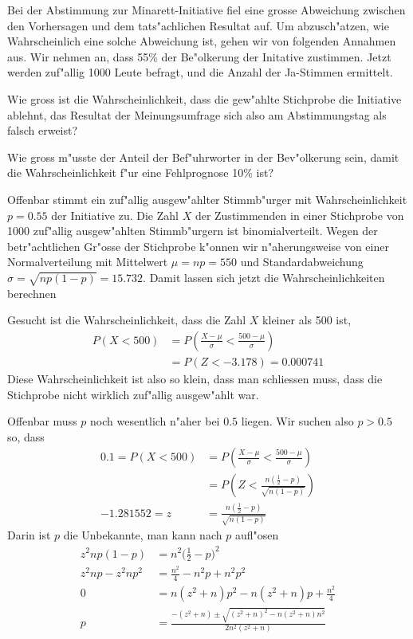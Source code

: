 Bei der Abstimmung zur Minarett-Initiative fiel eine grosse Abweichung zwischen
den Vorhersagen und dem tats"achlichen Resultat auf. Um abzusch"atzen,
wie Wahrscheinlich eine solche Abweichung ist, gehen wir von folgenden
Annahmen aus. Wir nehmen an, dass 55\% der Be"olkerung der Initative
zustimmen. Jetzt werden zuf"allig 1000 Leute befragt, und die Anzahl der
Ja-Stimmen ermittelt.
\begin{teilaufgaben}
\item
Wie gross ist die Wahrscheinlichkeit, dass die
gew"ahlte Stichprobe die Initiative ablehnt, das Resultat der
Meinungsumfrage sich also am Abstimmungstag als falsch erweist?
\item Wie gross m"usste der Anteil der Bef"uhrworter in der Bev"olkerung
sein, damit die Wahrscheinlichkeit f"ur eine Fehlprognose 10\% ist?
\end{teilaufgaben}

\begin{loesung}
Offenbar stimmt ein zuf"allig ausgew"ahlter Stimmb"urger mit
Wahrscheinlichkeit $p=0.55$ der Initiative zu. Die Zahl $X$ der Zustimmenden
in einer Stichprobe von 1000 zuf"allig ausgew"ahlten Stimmb"urgern ist
binomialverteilt. Wegen der betr"achtlichen Gr"osse der Stichprobe k"onnen
wir n"aherungsweise von einer Normalverteilung mit Mittelwert $\mu=np=550$ und
Standardabweichung $\sigma=\sqrt{np(1-p)}
=15.732
$.
Damit lassen sich jetzt die Wahrscheinlichkeiten berechnen
\begin{teilaufgaben}
\item
Gesucht ist die Wahrscheinlichkeit, dass die Zahl $X$ kleiner als 500 ist,
\begin{align*}
P(X < 500)&=P\left(\frac{X-\mu}{\sigma}<\frac{500-\mu}{\sigma}\right)\\
        &=P(Z<
-3.178
)=0.000741
\end{align*}
Diese Wahrscheinlichkeit ist also so klein, dass man schliessen muss,
dass die Stichprobe nicht wirklich zuf"allig ausgew"ahlt war.
\item
Offenbar muss $p$ noch wesentlich n"aher bei $0.5$ liegen.  Wir suchen also
$p>0.5$ so, dass
\begin{align*}
0.1=P(X<500)&=P\left(\frac{X-\mu}{\sigma}<\frac{500-\mu}{\sigma}\right)\\
&=P\left(Z<\frac{n(\frac12-p)}{\sqrt{n(1-p)}}\right)\\
-1.281552=
z&=\frac{n(\frac12-p)}{\sqrt{n(1-p)}}
\end{align*}
Darin ist $p$ die Unbekannte, man kann nach $p$ aufl"osen
\begin{align*}
z^2np(1-p)&=n^2\biggl(\frac12-p\biggr)^2\\
z^2np-z^2np^2
&=\frac{n^2}4-n^2p+n^2p^2
\\
0&=n(z^2+n)p^2
-n(z^2+n)p
+\frac{n^2}4
\\
p&=\frac{-(z^2+n)\pm\sqrt{(z^2+n)^2-n(z^2+n)n^2}}{2n^2(z^2+n)}
\end{align*}
\end{teilaufgaben}
\end{loesung}

